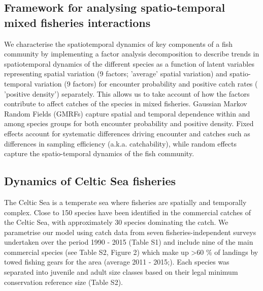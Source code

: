\documentclass{nature}
\begin{document}
\begin{linenumbers}
\subsection{Framework for analysing spatio-temporal mixed fisheries
	interactions}

 We 
characterise the spatiotemporal dynamics of key components of a fish community
by  implementing a factor analysis decomposition
to describe trends in spatiotemporal dynamics of the different species as a
function of latent variables \cite{Thorson2015} representing spatial variation
(9 factors;  'average' spatial variation) and
spatio-temporal variation (9 factors) for encounter probability and positive
catch rates ( 'positive density')
separately\cite{Thorson2015a}. This allows us to  take account of how the factors contribute to affect
catches of the species in mixed fisheries.  Gaussian Markov
Random Fields (GMRFs)  capture spatial and temporal dependence
within and among species groups for both encounter probability and positive
density\cite{Thorson2013}.  Fixed effects  account for
systematic differences driving encounter and catches such as
differences in sampling efficiency (a.k.a.  catchability), while random effects
capture the spatio-temporal dynamics of the fish community.

\subsection{Dynamics of Celtic Sea fisheries}

 The Celtic Sea is a temperate sea where fisheries are spatially
and temporally complex\cite{Ellis2000, Gerritsen2012}.
Close to 150 species have been identified in the commercial catches of the
Celtic Sea, with approximately 30 species dominating the catch\cite{Mateo2016}.
We parametrise our  model using catch data from seven
fisheries-independent surveys undertaken  over the
period 1990 - 2015 (Table S1) and include nine of the main commercial species
(see Table S2, Figure 2)  which make up \textgreater 60 \%
of landings by towed fishing gears for the area (average 2011 -
2015;\cite{STECF2017}). Each species was separated into juvenile and adult size
classes based on their legal minimum conservation reference size (Table S2).




\end{linenumbers}
\end{document}
